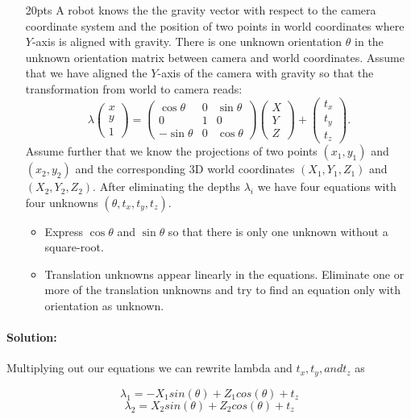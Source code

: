 \documentclass[11pt,english]{article}
\begin{document}
\begin{enumerate}
\item[20pts]
A robot knows the the gravity vector with respect to the camera coordinate system and the position of two points in world coordinates where $Y$-axis is aligned with gravity. 
There is one unknown orientation $\theta$ in the unknown orientation matrix between camera and world coordinates. Assume that we have aligned the $Y$-axis of the camera with gravity so that the transformation from world to camera reads:
\[
\lambda \begin{pmatrix} x \\ y \\ 1 \end{pmatrix}  = \begin{pmatrix} \cos\theta & 0 & \sin\theta 
\\ 0 & 1 & 0 
\\ -\sin\theta & 0 & \cos\theta
\end{pmatrix}
 \begin{pmatrix} X \\ Y \\ Z \end{pmatrix} + \begin{pmatrix} t_x \\ t_y \\ t_z \end{pmatrix}.
 \]
Assume further that we know the projections of two points $(x_1,y_1)$ and $(x_2,y_2)$ 
and the corresponding 3D world coordinates $(X_1,Y_1,Z_1)$ and $(X_2,Y_2,Z_2)$.
After eliminating the depths $\lambda_i$ we have four equations with four unknowns 
$(\theta,t_x,t_y,t_z)$.
\begin{itemize}
\item
Express $\cos\theta$ and $\sin\theta$ so that there is only one unknown without a square-root.
\item
Translation unknowns appear linearly in the equations. Eliminate one or more of the translation unknowns and try to find an equation only with orientation as unknown.
\end{itemize}
\end{enumerate}
\paragraph{Solution:}
Multiplying out our equations we can rewrite lambda and $t_x , t_y , and t_z$ as 

$$ \lambda_1 = - X_1 sin(\theta) + Z_1 cos(\theta) + t_z $$ 
$$ \lambda_2 =  X_2 sin(\theta) + Z_2 cos(\theta) + t_z $$ 
\end{document}
